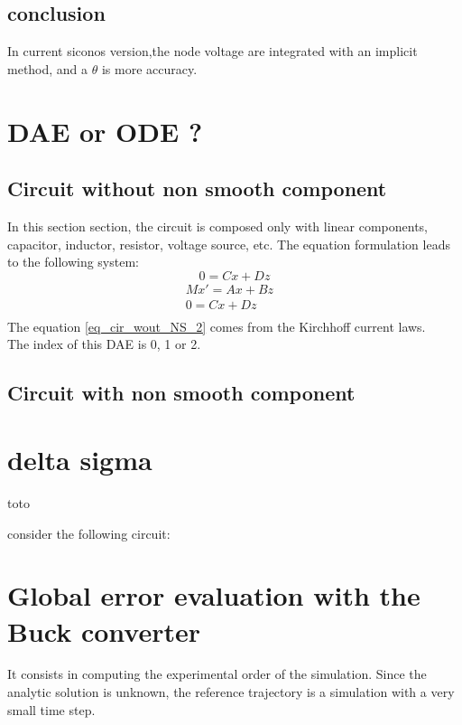 \subsection{conclusion}
In current siconos version,the node voltage are integrated with an implicit method, and a $\theta$
is more accuracy.


\section{ DAE or ODE ?}

\subsection{Circuit without non smooth component}
In this section section, the circuit is composed only with linear components, capacitor, inductor,
resistor, voltage source, etc. The equation formulation leads to the following system:
\[ \]
\[0 = Cx + Dz \]
 \begin{eqnarray}
Mx'=Ax + Bz&\label{eq_cir_wout_NS_1}\\
0=Cx+ Dz &\label{eq_cir_wout_NS_2}\\
\end{eqnarray}
The equation \ref{eq_cir_wout_NS_2} comes from the Kirchhoff current laws.\\

The index of this DAE is 0, 1 or 2.
\subsection{Circuit with non smooth component}

\newpage
\section{delta sigma}
toto
\begin{figure}[h]

\end{figure}


\newpage
consider the following circuit:
\begin{figure}[h]
\centerline{
 \scalebox{0.7}{
    
 }
}\end{figure}

\newpage
\section{Global error evaluation with the Buck converter}
It consists in computing the experimental order of the simulation. Since the analytic solution is
unknown, the reference trajectory is a simulation with a very small time step.
